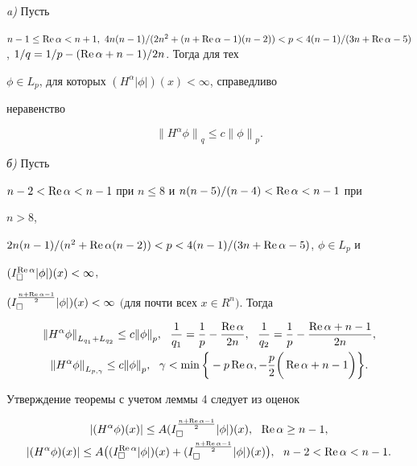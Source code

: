 \begin{thm} {\em a)} Пусть


$n-1\leq\R\alpha<n+1,\ 4n(n-1)/(2n^2+(n+\R\alpha-1)


(n-2))<p<4(n-1)/(3n+\R\alpha-5)$, $1/q=1/p-(\R\alpha+n-1)/2n$. Тогда для тех


$\phi\in L_p$, для которых $(H^\alpha|\phi|)(x)<\infty$, справедливо


неравенство


$$


{\|H^\alpha\phi\|}_q\leq c{\|\phi\|}_p.


$$





{\em б)} Пусть


$n-2<\operatorname{Re}\alpha<n-1$ при $n\leq 8$ и $n(n-5)/(n-4)<\operatorname{Re}\alpha<n-1$ при


$n{>}8$,


$2n(n-1)/(n^2+\operatorname{Re}\alpha(n-2))<p<4(n-1)/(3n+\operatorname{Re}\alpha-5)$, $\phi\in L_p$ и


$(I_{\square}^{\operatorname{Re}\alpha}|\phi|)(x)<\infty$,


$(I_{\square}^{\frac{n+\R\alpha-1}{2}}


|\phi|)(x)<\infty$ $($для почти всех $x\in R^n)$. Тогда


\begin{gather*}


{\|H^\alpha\phi\|}_{L_{q_1}+L_{q_2}}\leq c{\|\phi\|}_p,\ \


\frac{1}{q_1}=\frac{1}{p}-\frac{\R\alpha}{2n},


\ \ \frac{1}{q_2}=\frac{1}{p}-\frac{\R\alpha+n-1}{2n}, \\


%


{\|H^\alpha\phi\|}_{L_{p,\gamma}}\leq c{\|\phi\|}_p,\ \ \gamma <


\min\bigg\{-p\R\alpha, -\frac{p}{2}\bigg(\R\alpha+n-1\bigg)\bigg\}.


\end{gather*}


\end{thm}





Утверждение теоремы с учетом леммы 4 следует из оценок


\begin{gather*}


|(H^\alpha\phi)(x)|\leq A(I_{\square}^{\frac{n+\R\alpha-1}{2}}|\phi|)(x),


\ \ \R\alpha\geq n-1,\\


%


|(H^\alpha\phi)(x)|\leq A \big((I_{\square}^{\R\alpha}|\phi|)(x) +


(I_{\square}^{\frac{n+\R\alpha-1}{2}}|\phi|)(x)\big),\ \ n-2<\R\alpha<n-1.


\end{gather*}





